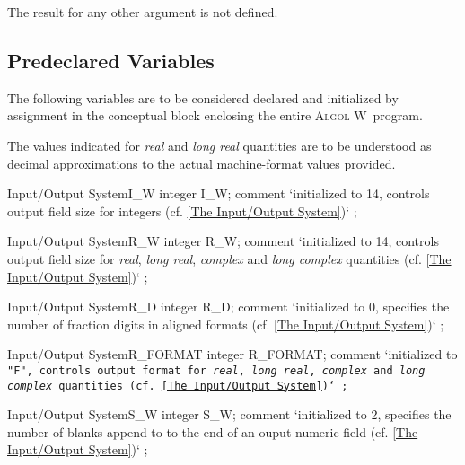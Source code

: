 \documentclass[a4paper]{article}
\def\ALGOLW{\textsc{Algol W}}
\def\T#1{\textit{#1}}
\begin{document}
\noindent The result for any other argument is not defined.


\newpage
\subsection{Predeclared Variables}
\label{Predeclared Variables}

The following variables are to be considered declared and initialized
by assignment in the conceptual block enclosing the entire \ALGOLW\
program.

The values indicated for \T{real} and \T{long real} quantities are to
be understood as decimal approximations to the actual machine-format
values provided.

\begin{VariableDeclaration}{Input/Output System}{I\_W}
integer I_W;
comment `\rm initialized to 14, controls output field size for integers (cf. \ref{The Input/Output System})` ;
\end{VariableDeclaration}

\begin{VariableDeclaration}{Input/Output System}{R\_W}
integer R_W;
comment `\rm initialized to 14, controls output field size for \T{real}, \T{long real}, \T{complex} and \T{long complex} quantities (cf. \ref{The Input/Output System})` ;
\end{VariableDeclaration}

\begin{VariableDeclaration}{Input/Output System}{R\_D}
integer R_D;
comment `\rm initialized to 0, specifies the number of fraction digits in aligned formats (cf. \ref{The Input/Output System})` ;
\end{VariableDeclaration}

\begin{VariableDeclaration}{Input/Output System}{R\_FORMAT}
integer R_FORMAT;
comment `\rm initialized to \tt "F"\rm, controls output format for \T{real}, \T{long real}, \T{complex} and \T{long complex} quantities (cf. \ref{The Input/Output System})` ;
\end{VariableDeclaration}

\begin{VariableDeclaration}{Input/Output System}{S\_W}
integer S_W; 
comment `\rm initialized to 2, specifies the number of blanks append to to the end of an ouput numeric field (cf. \ref{The Input/Output System})` ;
\end{VariableDeclaration}
\end{document}
